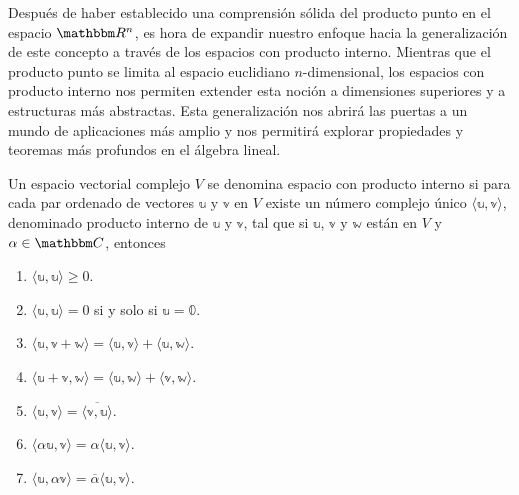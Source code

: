 Después de haber establecido una comprensión sólida del producto punto en el espacio $\RR[n]$, es hora de expandir nuestro enfoque hacia la generalización de este concepto a través de los espacios con producto interno. Mientras que el producto punto se limita al espacio euclidiano \(n\)-dimensional, los espacios con producto interno nos permiten extender esta noción a dimensiones superiores y a estructuras más abstractas. Esta generalización nos abrirá las puertas a un mundo de aplicaciones más amplio y nos permitirá explorar propiedades y teoremas más profundos en el álgebra lineal.

\newpage

\begin{definition}\label{def:espaciocomplejo_productointerno}
    Un espacio vectorial complejo $V$ se denomina espacio con producto interno si para cada par ordenado de vectores $\mathbb{u}$ y $\mathbb{v}$ en $V$ existe un número complejo único $\langle \mathbb{u}, \mathbb{v} \rangle$, denominado producto interno de $\mathbb{u}$ y $\mathbb{v}$, tal que si $\mathbb{u}$, $\mathbb{v}$ y $\mathbb{w}$ están en $V$ y $\alpha \in \CC$, entonces
    \begin{enumerate}[label=\roman*)]
        \item $\langle \mathbb{u}, \mathbb{u} \rangle \geq 0$.
        \item $\langle \mathbb{u}, \mathbb{u} \rangle = 0$ si y solo si $\mathbb{u} = \mathbb{0}$.
        \item $\langle \mathbb{u}, \mathbb{v} + \mathbb{w} \rangle = \langle \mathbb{u}, \mathbb{v} \rangle + \langle \mathbb{u}, \mathbb{w} \rangle$.
        \item $\langle \mathbb{u} + \mathbb{v}, \mathbb{w} \rangle = \langle \mathbb{u}, \mathbb{w} \rangle + \langle \mathbb{v}, \mathbb{w} \rangle$.
        \item $\langle \mathbb{u}, \mathbb{v} \rangle = \overline{\langle \mathbb{v}, \mathbb{u} \rangle}$.
        \item $\langle \alpha \mathbb{u}, \mathbb{v} \rangle = \alpha \langle \mathbb{u}, \mathbb{v} \rangle$.
        \item $\langle \mathbb{u}, \alpha \mathbb{v} \rangle = \overline{\alpha} \langle \mathbb{u}, \mathbb{v} \rangle$.
    \end{enumerate}
\end{definition}

